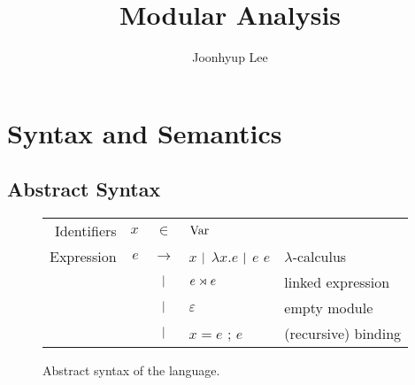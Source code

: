 \documentclass{article}
\title{Modular Analysis}
\author{Joonhyup Lee}
\begin{document}
\maketitle
\section{Syntax and Semantics}
\subsection{Abstract Syntax}
\begin{figure}[htb]
  \centering
  \begin{tabular}{rrcll}
    Identifiers & $x$ & $\in$         & $\text{Var}$                                                      \\
    Expression  & $e$ & $\rightarrow$ & $x$ $|$ $\lambda x.e$ $|$ $e$ $e$ & $\lambda$-calculus  \\
                &     & $|$       & ${e}\rtimes{e}$                             & linked expression   \\
                &     & $|$       & $\varepsilon$                             & empty module        \\
                &     & $|$       & $x=e$ ; $e$                               & (recursive) binding
  \end{tabular}
  \caption{Abstract syntax of the language.}
  \label{fig:syntax}
\end{figure}
\end{document}
